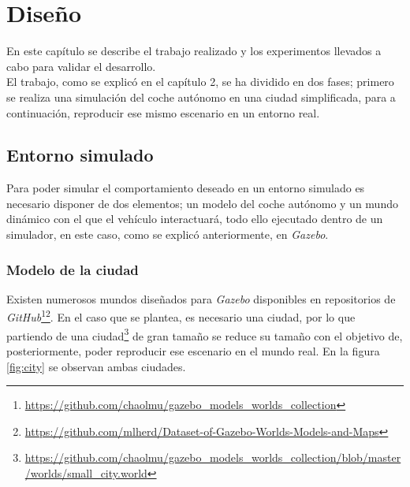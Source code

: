 \chapter{Diseño}
\label{cap:capitulo4}

En este capítulo se describe el trabajo realizado y los experimentos llevados a cabo para validar el desarrollo.\\

El trabajo, como se explicó en el capítulo 2, se ha dividido en dos fases; primero se realiza una simulación del coche autónomo en una ciudad simplificada, para a continuación,
reproducir ese mismo escenario en un entorno real.\\

\section{Entorno simulado}
\label{section:simulation}
Para poder simular el comportamiento deseado en un entorno simulado es necesario disponer de dos elementos; un modelo del coche autónomo y un mundo dinámico con el que el vehículo
interactuará, todo ello ejecutado dentro de un simulador, en este caso, como se explicó anteriormente, en \textit{Gazebo}.\\

\subsection{Modelo de la ciudad}
\label{subsection:citymodel}
Existen numerosos mundos diseñados para \textit{Gazebo} disponibles en repositorios de
\textit{GitHub}\footnote{\url{https://github.com/chaolmu/gazebo_models_worlds_collection}}\footnote{\url{https://github.com/mlherd/Dataset-of-Gazebo-Worlds-Models-and-Maps}}. En
el caso que se plantea, es necesario una ciudad, por lo que partiendo de una
ciudad\footnote{\url{https://github.com/chaolmu/gazebo_models_worlds_collection/blob/master/worlds/small_city.world}} de gran tamaño se reduce su tamaño con el objetivo de,
posteriormente, poder reproducir ese escenario en el mundo real. En la figura \ref{fig:city} se observan ambas ciudades.\\

